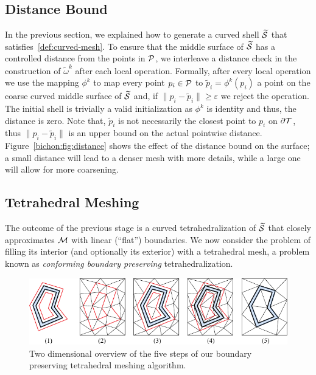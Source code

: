 \subsection{Distance Bound}\label{cumin:sec:distance}

In the previous section, we explained how to generate a curved shell $\prS$ that satisfies~\ref{def:curved-mesh}. To ensure that the middle surface of $\prS$ has a controlled distance from the points in $\P$, we interleave a distance check in the construction of $\widetilde\omega^k$ after each local operation. Formally, after every local operation we use the mapping $\phi^k$ to map every point $p_i\in\P$ to $\widetilde p_i = \phi^k(p_i)$ a point on the coarse curved middle surface of $\prS$ and, if $\|p_i-\widetilde p_i\| \geq \varepsilon$ we reject the operation. The initial shell is trivially a valid initialization as $\phi^k$ is identity and thus, the distance is zero. Note that, $\widetilde p_i$ is not necessarily the closest point to $p_i$ on $\partial\T$, thus $\|p_i-\widetilde p_i\|$ is an upper bound on the actual pointwise distance. Figure~\ref{bichon:fig:distance} shows the effect of the distance bound on the surface; a small distance will lead to a denser mesh with more details, while a {large} one will allow for more coarsening.



\subsection{Tetrahedral Meshing}\label{cumin:sec:tets}

The outcome of the previous stage is a curved tetrahedralization of $\prS$ that closely approximates $\M$ with linear (``flat'') boundaries. We now consider the problem of filling its interior (and optionally its exterior) with a tetrahedral mesh, a problem known as  \emph{conforming boundary preserving} tetrahedralization. 


\begin{figure}
    \centering
    \includegraphics[width=\linewidth]{curve_meshing_in_shell_tex/figs/illustrations/conforming-overview.pdf}
    \caption{Two dimensional overview of the five steps of our boundary preserving tetrahedral meshing algorithm.}
    \label{bichon:fig:conforming-overview}
\end{figure}

